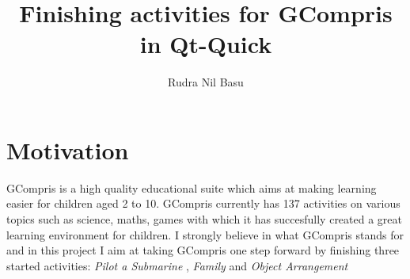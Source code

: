 \documentclass[preprint,12pt]{elsarticle}
\begin{document}
\begin{frontmatter}



\title{Finishing activities for GCompris in Qt-Quick}


\author{Rudra Nil Basu}

\address{ \textbf{Email ID}: rudra.nil.basu.1996@gmail.com}
\address{ \textbf{Freenode IRC Nick}: rudra}
\address{ \textbf{Location}: Kolkata, West Bengal, India UTC+5.30}

\end{frontmatter}


\section{Motivation}
\label{S:1}


GCompris is a high quality educational suite which aims at making learning easier for children aged 2 to 10. GCompris currently has 137 activities on various topics such as science, maths, games with which it has succesfully created a great learning environment for children. I strongly believe in what GCompris stands for and in this project I aim at taking GCompris one step forward by finishing three started activities: \textit{Pilot a Submarine} , \textit{Family} and \textit{Object Arrangement}
\end{document}
